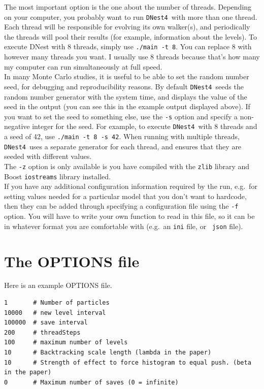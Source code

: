 \documentclass[a4paper, 11pt]{article}
\newcommand{\dnest}{{\tt DNest4}}
\begin{document}
The most important option is the one about the number of threads. Depending on
your computer, you probably want to run \dnest~with more than one thread.
Each thread will be responsible for evolving its own walker(s), and periodically
the threads will pool their results (for example, information about the
levels). To execute DNest with 8 threads, simply use {\tt ./main -t 8}. You can
replace 8 with however many threads you want. I usually use 8 threads because
that's how many my computer can run simultaneously at full speed.\\

In many Monte Carlo studies, it is useful to be able to set the random number
seed, for debugging and reproducibility reasons. By default \dnest~seeds the
random number generator with the system time, and displays the value of the
seed in the output (you can see this in the example output displayed above).
If you want to set the seed to
something else, use the {\tt -s} option and specify a non-negative integer for
the seed. For example, to execute \dnest~with
8 threads and a seed of 42, use {\tt ./main -t 8 -s 42}.
When running with multiple threads, \dnest~uses a separate generator for each
thread, and ensures that they are seeded with different values.\\

The {\tt -z} option is only available is you have compiled with the {\tt zlib}
library and Boost {\tt iostreams} library installed. \\

If you have any additional configuration information required by the run, e.g.\
for setting values needed for a particular model that you don't want to hardcode,
then they can be added through specifying a configuration file using the {\tt -f}
option. You will have to write your own function to read in this file, so it can
be in whatever format you are comfortable with (e.g.\ an {\tt ini} file, or {\tt
json} file).\\

\section{The OPTIONS file}\label{sec:options}
Here is an example OPTIONS file.
\begin{framed}
\begin{verbatim}
1       # Number of particles
10000   # new level interval
100000  # save interval
200     # threadSteps
100     # maximum number of levels
10      # Backtracking scale length (lambda in the paper)
10      # Strength of effect to force histogram to equal push. (beta in the paper)
0       # Maximum number of saves (0 = infinite)
\end{verbatim}
\end{framed}
\end{document}
